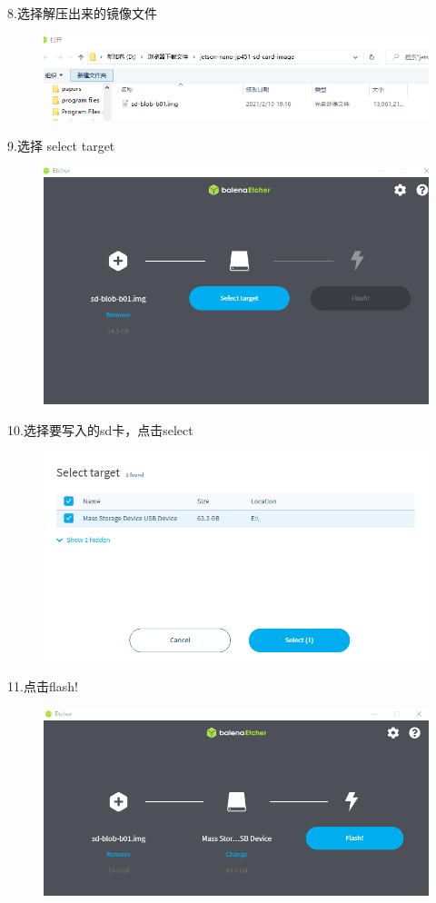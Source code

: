 \documentclass[openbib]{article}
\begin{document}
8.选择解压出来的镜像文件
\begin{figure}[H]
	\centering
	\includegraphics[scale=0.4]{b7}
\end{figure}

9.选择 select target
\begin{figure}[H]
	\centering
	\includegraphics[scale=0.4]{b8}
\end{figure}

10.选择要写入的sd卡，点击select
\begin{figure}[H]
	\centering
	\includegraphics[scale=0.4]{b9}
\end{figure}

11.点击flash!
\begin{figure}[H]
	\centering
	\includegraphics[scale=0.4]{b10}
\end{figure}
\end{document}
